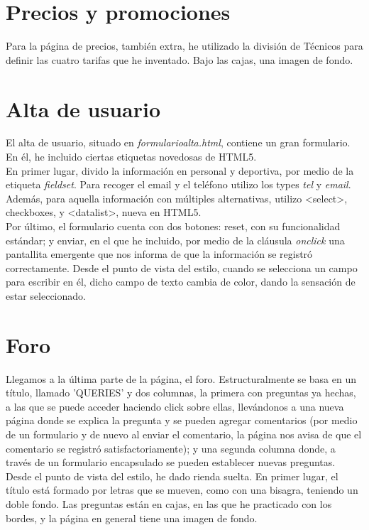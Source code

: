 \section{Precios y promociones}


Para la página de precios, también extra, he utilizado la división de Técnicos para definir las cuatro tarifas que he inventado. Bajo las cajas, una imagen de fondo. 

\section{Alta de usuario}

El alta de usuario, situado en \textit{formularioalta.html}, contiene un gran formulario. En él, he incluido ciertas etiquetas novedosas de HTML5. \\
En primer lugar, divido la información en personal y deportiva, por medio de la etiqueta \textit{fieldset}. Para recoger el email y el teléfono utilizo los types \textit{tel} y \textit{email}. Además, para aquella información con múltiples alternativas, utilizo <select>, checkboxes, y <datalist>, nueva en HTML5. \\

Por último, el formulario cuenta con dos botones: reset, con su funcionalidad estándar; y enviar, en el que he incluido, por medio de la cláusula \textit{onclick} una pantallita emergente que nos informa de que la información se registró correctamente. Desde el punto de vista del estilo, cuando se selecciona un campo para escribir en él, dicho campo de texto cambia de color, dando la sensación de estar seleccionado.

\section{Foro}

Llegamos a la última parte de la página, el foro. Estructuralmente se basa en un título, llamado 'QUERIES' y dos columnas, la primera con preguntas ya hechas, a las que se puede acceder haciendo click sobre ellas, llevándonos a una nueva página donde se explica la pregunta y se pueden agregar comentarios (por medio de un formulario y de nuevo al enviar el comentario, la página nos avisa de que el comentario se registró satisfactoriamente); y una segunda columna donde, a través de un formulario encapsulado se pueden establecer nuevas preguntas. \\

Desde el punto de vista del estilo, he dado rienda suelta. En primer lugar, el título está formado por letras que se mueven, como con una bisagra, teniendo un doble fondo. Las preguntas están en cajas, en las que he practicado con los bordes, y la página en general tiene una imagen de fondo.


